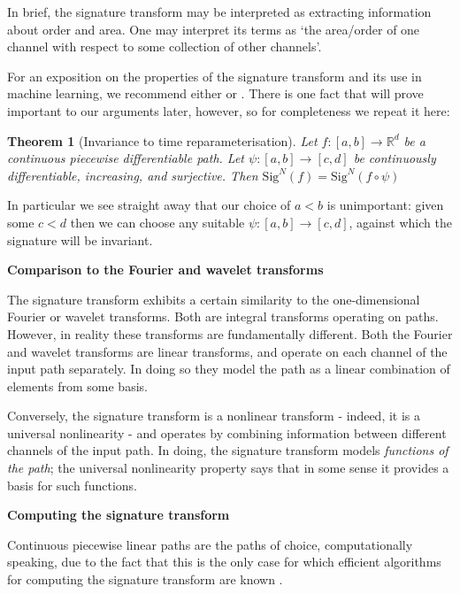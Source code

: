 \documentclass{article}
\renewcommand{\subsubsection}[1]{\textbf{#1}

} %
\newcommand{\reals}{\mathbb{R}}
\newcommand{\sig}{\mathrm{Sig}^N}
\newtheorem{theorem}{Theorem}
\begin{document}
In brief, the signature transform may be interpreted as extracting information about order and area. One may interpret its terms as `the area/order of one channel with respect to some collection of other channels'.

For an exposition on the properties of the signature transform and its use in machine learning, we recommend either \citep{primer2016} or \citep[Appendix A]{kidger2019deep}. There is one fact that will prove important to our arguments later, however, so for completeness we repeat it here:
\begin{theorem}[Invariance to time reparameterisation]\label{theorem:invariancetime}
Let $f \colon [a, b] \to \reals^d$ be a continuous piecewise differentiable path. Let $\psi \colon [a, b] \to [c, d]$ be continuously differentiable, increasing, and surjective. Then $\sig(f) = \sig(f \circ \psi)$
\end{theorem}
In particular we see straight away that our choice of $a < b$ is unimportant: given some $c < d$ then we can choose any suitable $\psi \colon [a, b] \to [c, d]$, against which the signature will be invariant.

\subsubsection{Comparison to the Fourier and wavelet transforms}
The signature transform exhibits a certain similarity to the one-dimensional Fourier or wavelet transforms. Both are integral transforms operating on paths. However, in reality these transforms are fundamentally different. Both the Fourier and wavelet transforms are linear transforms, and operate on each channel of the input path separately. In doing so they model the path as a linear combination of elements from some basis.

Conversely, the signature transform is a nonlinear transform - indeed, it is a universal nonlinearity - and operates by combining information between different channels of the input path. In doing, the signature transform models \emph{functions of the path}; the universal nonlinearity property says that in some sense it provides a basis for such functions.

\subsubsection{Computing the signature transform}
Continuous piecewise linear paths are the paths of choice, computationally speaking, due to the fact that this is the only case for which efficient algorithms for computing the signature transform are known \citep{signatory}.
\end{document}
